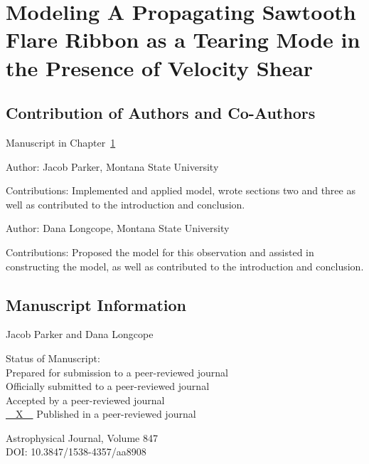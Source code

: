 
\chapter{Modeling A Propagating Sawtooth Flare Ribbon as a Tearing Mode in the Presence of Velocity Shear}\label{CH:manuscript1}

\section{Contribution of Authors and Co-Authors}

Manuscript in Chapter~\ref{CH:manuscript1}

Author: Jacob Parker, Montana State University

\begin{singlespace}
	Contributions: Implemented and applied model, wrote sections two and three as well as contributed to the introduction and conclusion.
\end{singlespace}


Author: Dana Longcope, Montana State University

\begin{singlespace}
	Contributions: Proposed the model for this observation and assisted in constructing the model, as well as contributed to the introduction and conclusion.
\end{singlespace}



\newpage

\section{Manuscript Information}

Jacob Parker and Dana Longcope

\begin{singlespace}
  Status of Manuscript: \\\indent %
  \underline{\phantom{~~X~~}} Prepared for submission to a peer-reviewed journal\\\indent
  \underline{\phantom{~~X~~}} Officially submitted to a peer-reviewed journal\\\indent
  \underline{\phantom{t~~X~~}} Accepted by a peer-reviewed journal\\\indent
  \underline{~~X~~} Published in a peer-reviewed journal
\end{singlespace}

\begin{singlespace}
  Astrophysical Journal,  Volume 847 \\\indent
  DOI: 10.3847/1538-4357/aa8908
\end{singlespace}

\newpage


